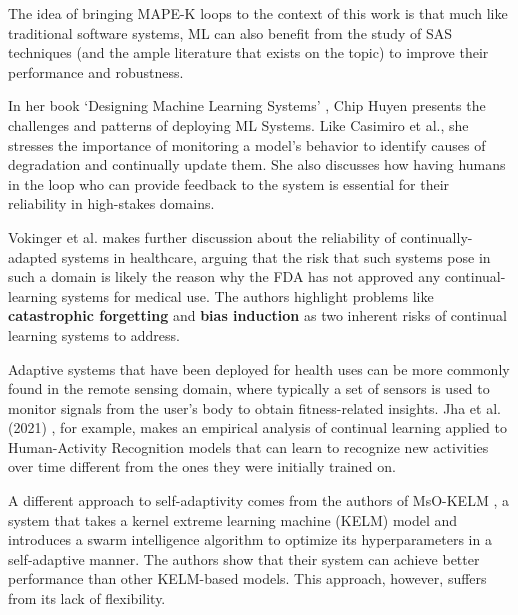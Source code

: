 \documentclass[../main.tex]{subfiles}
\begin{document}
    The idea of bringing MAPE-K loops to the context of this work is that much like traditional software systems, ML can also benefit from the study of SAS techniques (and the ample literature that exists on the topic) to improve their performance and robustness.

    In her book `Designing Machine Learning Systems' \cite{huyen_designing_2022}, Chip Huyen presents the challenges and patterns of deploying ML Systems. Like Casimiro et al., she stresses the importance of monitoring a model's behavior to identify causes of degradation and continually update them. She also discusses how having humans in the loop who can provide feedback to the system is essential for their reliability in high-stakes domains.

    Vokinger et al. \cite{vokingerContinualLearningMedical2021} makes further discussion about the reliability of continually-adapted systems in healthcare, arguing that the risk that such systems pose in such a domain is likely the reason why the FDA has not approved any continual-learning systems for medical use. The authors highlight problems like \textbf{catastrophic forgetting} and \textbf{bias induction} as two inherent risks of continual learning systems to address.

    Adaptive systems that have been deployed for health uses can be more commonly found in the remote sensing domain, where typically a set of sensors is used to monitor signals from the user's body to obtain fitness-related insights. Jha et al. (2021) \cite{jhaContinualLearningSensorbased2021}, for example, makes an empirical analysis of continual learning applied to Human-Activity Recognition models that can learn to recognize new activities over time different from the ones they were initially trained on.
    
    A different approach to self-adaptivity comes from the authors of MsO-KELM \cite{haoTechnologyOrientedPathwayAuxiliary2022}, a system that takes a kernel extreme learning machine (KELM) model \cite{xiaEvolvingKernelExtreme2022} and introduces a swarm intelligence algorithm to optimize its hyperparameters in a self-adaptive manner. The authors show that their system can achieve better performance than other KELM-based models. This approach, however, suffers from its lack of flexibility.
\end{document}
